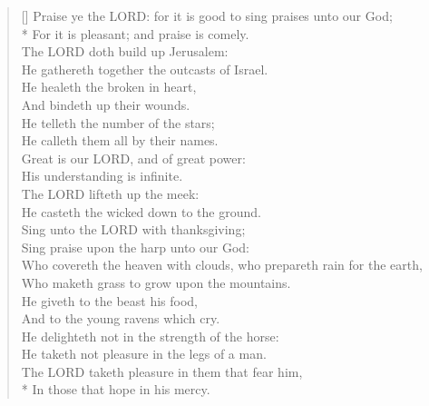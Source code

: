 \documentclass[MAIN]{subfiles}
\begin{document}
\begin{verse}[\versewidth]
Praise ye the {\hge LORD}: for it is good to sing praises unto our God;\\*
\vin For it is pleasant; and praise is comely.\\
The {\hge LORD} doth build up Jerusalem:\\
\vin He gathereth together the outcasts of Israel.\\
He healeth the broken in heart,\\
\vin And bindeth up their wounds.\\
He telleth the number of the stars;\\
\vin He calleth them all by their names.\\
Great is our {\hge LORD}, and of great power:\\
\vin His understanding is infinite.\\
The {\hge LORD} lifteth up the meek:\\
\vin He casteth the wicked down to the ground.\\
Sing unto the {\hge LORD} with thanksgiving;\\
\vin Sing praise upon the harp unto our God:\\
Who covereth the heaven with clouds, who prepareth rain for the earth,\\
\vin Who maketh grass to grow upon the mountains.\\
He giveth to the beast his food,\\
\vin And to the young ravens which cry.\\
He delighteth not in the strength of the horse:\\
\vin He taketh not pleasure in the legs of a man.\\
The {\hge LORD} taketh pleasure in them that fear him,\\*
\vin In those that hope in his mercy.
\end{verse}
\end{document}
